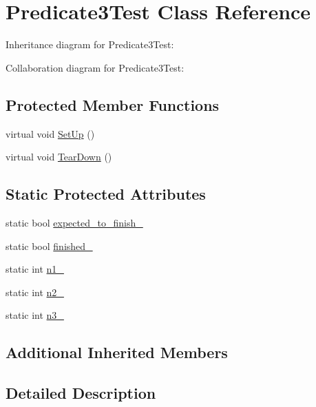 \hypertarget{class_predicate3_test}{}\section{Predicate3\+Test Class Reference}
\label{class_predicate3_test}


Inheritance diagram for Predicate3\+Test\+:


Collaboration diagram for Predicate3\+Test\+:
\subsection*{Protected Member Functions}
\begin{DoxyCompactItemize}
\item 
virtual void \hyperlink{class_predicate3_test_a92aad9566e0737b6739d1db14e7912be}{Set\+Up} ()
\item 
virtual void \hyperlink{class_predicate3_test_aa4dc395bded849b6e5175566d791aba7}{Tear\+Down} ()
\end{DoxyCompactItemize}
\subsection*{Static Protected Attributes}
\begin{DoxyCompactItemize}
\item 
static bool \hyperlink{class_predicate3_test_a42c11555410ee89bf6e59d39336a212c}{expected\+\_\+to\+\_\+finish\+\_\+}
\item 
static bool \hyperlink{class_predicate3_test_aa2ef0fa6aed09d872fb9ae36961b49eb}{finished\+\_\+}
\item 
static int \hyperlink{class_predicate3_test_ac232320a93f0c1e09886148a3e1929a5}{n1\+\_\+}
\item 
static int \hyperlink{class_predicate3_test_a11049ef16bcaadc8262faf7349c7676e}{n2\+\_\+}
\item 
static int \hyperlink{class_predicate3_test_afc1df6b079ffe22b87479b161d2ad2f7}{n3\+\_\+}
\end{DoxyCompactItemize}
\subsection*{Additional Inherited Members}


\subsection{Detailed Description}


